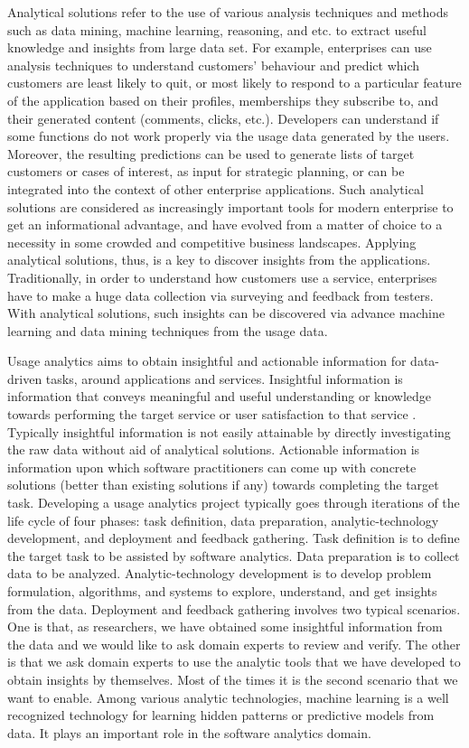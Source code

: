 Analytical solutions refer to the use of various analysis techniques and methods such as data mining, machine learning, reasoning, and etc. to extract useful knowledge and insights from large data set. For example, enterprises can use analysis techniques to understand customers' behaviour and predict which customers are least likely to quit, or most likely to respond to a particular feature of the application based on their profiles, memberships they subscribe to, and their generated content (comments, clicks, etc.). Developers can understand if some functions do not work properly via the usage data generated by the users. Moreover, the resulting predictions can be used to generate lists of target customers or cases of interest, as input for strategic planning, or can be integrated into the context of other enterprise applications. Such analytical solutions are considered as increasingly important tools for modern enterprise to get an informational advantage, and have evolved from a matter of choice to a necessity in some crowded and competitive business landscapes. Applying analytical solutions, thus, is a key to discover insights from the applications. Traditionally, in order to understand how customers use a service, enterprises have to make a huge data collection via surveying and feedback from testers. With analytical solutions, such insights can be discovered via advance machine learning and data mining techniques from the usage data. 

Usage analytics aims to obtain insightful and actionable information for data-driven tasks, around applications and services. Insightful information is information that conveys meaningful and useful understanding or knowledge towards performing the target service or user satisfaction to that service \cite{Zhang2011}. Typically insightful information is not easily attainable by directly investigating the raw data without aid of analytical solutions. Actionable information is information upon which software practitioners can come up with concrete solutions (better than existing solutions if any) towards completing the target task. Developing a usage analytics project typically goes through iterations of the life cycle of four phases: task definition, data preparation, analytic-technology development, and deployment and feedback gathering. Task definition is to define the target task to be assisted by software analytics. Data preparation is to collect data to be analyzed. Analytic-technology development is to develop problem formulation, algorithms, and systems to explore, understand, and get insights from the data. Deployment and feedback gathering involves two typical scenarios. One is that, as researchers, we have obtained some insightful information from the data and we would like to ask domain experts to review and verify. The other is that we ask domain experts to use the analytic tools that we have developed to obtain insights by themselves. Most of the times it is the second scenario that we want to enable. Among various analytic technologies, machine learning is a well recognized technology for learning hidden patterns or predictive models from data. It plays an important role in the software analytics domain. 

